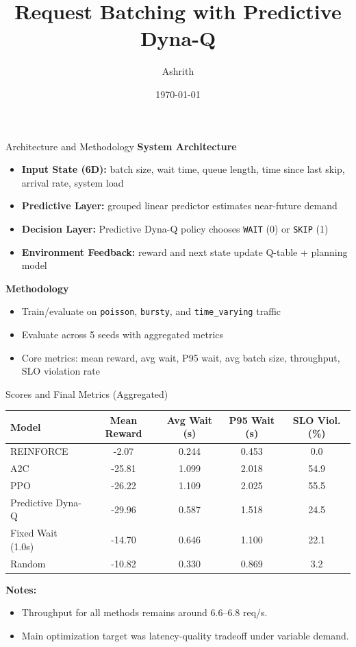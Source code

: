 \documentclass[aspectratio=169]{beamer}
\title{Request Batching with Predictive Dyna-Q}
\author{Ashrith}
\date{\today}
\begin{document}
\begin{frame}{Architecture and Methodology}
\small
\textbf{System Architecture}
\begin{itemize}
    \item \textbf{Input State (6D):} batch size, wait time, queue length, time since last skip, arrival rate, system load
    \item \textbf{Predictive Layer:} grouped linear predictor estimates near-future demand
    \item \textbf{Decision Layer:} Predictive Dyna-Q policy chooses \texttt{WAIT} (0) or \texttt{SKIP} (1)
    \item \textbf{Environment Feedback:} reward and next state update Q-table + planning model
\end{itemize}

\vspace{0.2cm}
\textbf{Methodology}
\begin{itemize}
    \item Train/evaluate on \texttt{poisson}, \texttt{bursty}, and \texttt{time\_varying} traffic
    \item Evaluate across 5 seeds with aggregated metrics
    \item Core metrics: mean reward, avg wait, P95 wait, avg batch size, throughput, SLO violation rate
\end{itemize}
\end{frame}

\begin{frame}{Scores and Final Metrics (Aggregated)}
\scriptsize
\begin{table}
\centering
\begin{tabular}{lcccc}
\hline
\textbf{Model} & \textbf{Mean Reward} & \textbf{Avg Wait (s)} & \textbf{P95 Wait (s)} & \textbf{SLO Viol. (\%)} \\
\hline
REINFORCE & -2.07 & 0.244 & 0.453 & 0.0 \\
A2C & -25.81 & 1.099 & 2.018 & 54.9 \\
PPO & -26.22 & 1.109 & 2.025 & 55.5 \\
Predictive Dyna-Q & -29.96 & 0.587 & 1.518 & 24.5 \\
Fixed Wait (1.0s) & -14.70 & 0.646 & 1.100 & 22.1 \\
Random & -10.82 & 0.330 & 0.869 & 3.2 \\
\hline
\end{tabular}
\end{table}

\vspace{0.15cm}
\footnotesize
\textbf{Notes:}
\begin{itemize}
    \item Throughput for all methods remains around 6.6--6.8 req/s.
    \item Main optimization target was latency-quality tradeoff under variable demand.
\end{itemize}
\end{frame}
\end{document}
